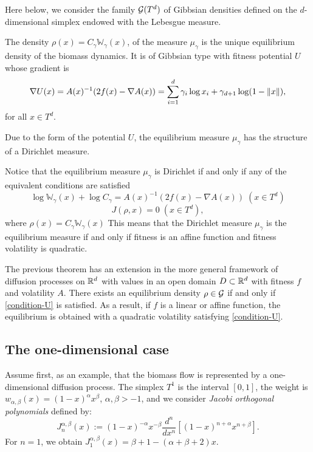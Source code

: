 \documentclass[12pt]{article}
\begin{document}
Here below, we consider the family $\mathcal{G}(T^d)$ of Gibbsian densities defined on the $d$-dimensional simplex endowed with the Lebesgue measure.
\begin{thm}\label{th:dirch-inv}
The density $\rho(x)=C_\gamma\mathbb{W}_\gamma(x)$, of the measure $\mu_\gamma$ is the unique equilibrium density of the biomass dynamics. It is of Gibbsian type with fitness potential $U$ whose gradient is
\begin{equation}\label{fitness-pot}
\nabla U(x)=A(x)^{-1}(2f(x)-\nabla A(x))=\sum_{i=1}^d\gamma_i\log x_i+\gamma_{d+1}\log(1-\left\Vert x\right\Vert),
\end{equation}
for all $x\in T^d$.

Due to the form of the potential $U$, the equilibrium measure $\mu_\gamma$ has the structure of a Dirichlet measure. 

Notice that the equilibrium measure $\mu_\gamma$ is Dirichlet if and only if any of the equivalent conditions are satisfied 
\begin{equation}\label{condition-U}
    \log \mathbb{W}_\gamma(x)+\log C_\gamma=A(x)^{-1}(2f(x)-\nabla A(x)) \;(x\in T^d)
\end{equation}
\begin{equation}\label{condition-current}
 J(\rho,x)=0 \;(x\in T^d),   
\end{equation}
where $\rho(x)=C_\gamma \mathbb{W}_\gamma(x)$
This means that the Dirichlet measure $\mu_\gamma$ is the equilibrium measure if and only if fitness is an affine function and fitness volatility is quadratic.
\end{thm}

\begin{rem}
    The previous theorem has an extension in the more general framework of diffusion processes on ${\mathbb R}^{d}$ with values in an open domain $D\subset{\mathbb R}^{d}$ with fitness $f$ and volatility $A$. There exists an equilibrium density $\rho\in\mathcal{G}$ if and only if \eqref{condition-U} is satisfied. As a result, if $f$ is a linear or affine function, the equilibrium is obtained with a quadratic volatility satisfying \eqref{condition-U}. 
    
\end{rem}
\subsection{The one-dimensional case}

Assume first, as an example, that the biomass flow is represented by a one-dimensional diffusion process. The simplex $T^1$ is the interval $[0,1]$, the weight is $w_{\alpha,\beta}(x)=(1-x)^\alpha x^\beta$, $\alpha,\beta>-1$, and we consider \textit{Jacobi orthogonal polynomials} defined by:
\begin{equation}
    J_n^{\alpha,\beta}(x):=(1-x)^{-\alpha}x^{-\beta}\frac{d^n}{dx^n}\left [(1-x)^{n+\alpha}x^{n+\beta}\right].
\end{equation}
For $n=1$, we obtain $J_1^{\alpha,\beta}(x)=\beta+1-(\alpha+\beta+2)x$.
\end{document}
